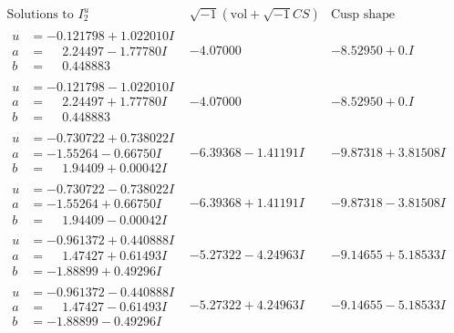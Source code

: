 \documentclass[1p]{elsarticle_modified}
\theoremstyle{definition}
\newcommand{\I}{\sqrt{-1}}
\begin{document}
$$\begin{array}{c|c|c}  
\text{Solutions to }I^u_{2}& \I (\text{vol} + \sqrt{-1}CS) & \text{Cusp shape}\\
 \hline 
\begin{aligned}
u &= -0.121798 + 1.022010 I \\
a &= \phantom{-}2.24497 - 1.77780 I \\
b &= \phantom{-}0.448883\phantom{ +0.000000I}\end{aligned}
 & -4.07000\phantom{ +0.000000I} & -8.52950 + 0. I\phantom{ +0.000000I} \\ \hline\begin{aligned}
u &= -0.121798 - 1.022010 I \\
a &= \phantom{-}2.24497 + 1.77780 I \\
b &= \phantom{-}0.448883\phantom{ +0.000000I}\end{aligned}
 & -4.07000\phantom{ +0.000000I} & -8.52950 + 0. I\phantom{ +0.000000I} \\ \hline\begin{aligned}
u &= -0.730722 + 0.738022 I \\
a &= -1.55264 - 0.66750 I \\
b &= \phantom{-}1.94409 + 0.00042 I\end{aligned}
 & -6.39368 - 1.41191 I & -9.87318 + 3.81508 I \\ \hline\begin{aligned}
u &= -0.730722 - 0.738022 I \\
a &= -1.55264 + 0.66750 I \\
b &= \phantom{-}1.94409 - 0.00042 I\end{aligned}
 & -6.39368 + 1.41191 I & -9.87318 - 3.81508 I \\ \hline\begin{aligned}
u &= -0.961372 + 0.440888 I \\
a &= \phantom{-}1.47427 + 0.61493 I \\
b &= -1.88899 + 0.49296 I\end{aligned}
 & -5.27322 - 4.24963 I & -9.14655 + 5.18533 I \\ \hline\begin{aligned}
u &= -0.961372 - 0.440888 I \\
a &= \phantom{-}1.47427 - 0.61493 I \\
b &= -1.88899 - 0.49296 I\end{aligned}
 & -5.27322 + 4.24963 I & -9.14655 - 5.18533 I \\ \hline\begin{aligned}

\end{aligned}
\end{array}$$
\end{document}
